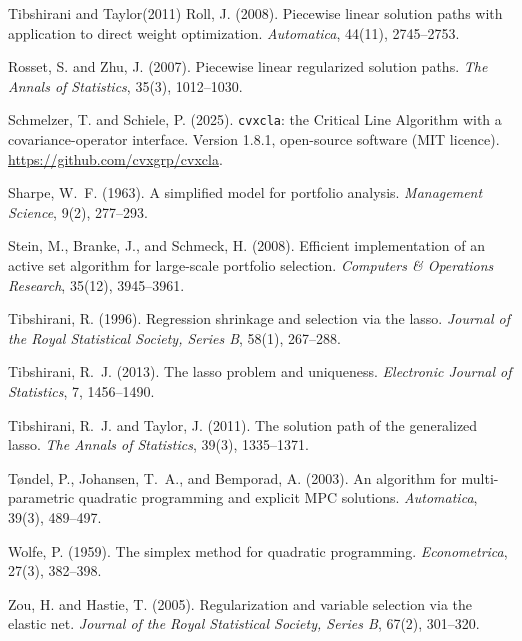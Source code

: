 \documentclass[sts]{imsart}
\theoremstyle{plain}
\theoremstyle{definition}
\begin{document}
\begin{thebibliography}{Tibshirani and Taylor(2011)}
 Roll, J. (2008). Piecewise linear solution paths with
application to direct weight optimization. \emph{Automatica}, 44(11), 2745--2753.

 Rosset, S. and Zhu, J. (2007). Piecewise
linear regularized solution paths. \emph{The Annals of Statistics}, 35(3),
1012--1030.

 Schmelzer, T. and Schiele, P.
(2025). \texttt{cvxcla}: the Critical Line Algorithm with a covariance-operator
interface. Version 1.8.1, open-source software (MIT licence).
\url{https://github.com/cvxgrp/cvxcla}.

 Sharpe, W.~F. (1963). A simplified model for
portfolio analysis. \emph{Management Science}, 9(2), 277--293.

 Stein, M., Branke, J., and Schmeck, H. (2008).
Efficient implementation of an active set algorithm for large-scale portfolio
selection. \emph{Computers \& Operations Research}, 35(12), 3945--3961.

 Tibshirani, R. (1996). Regression
shrinkage and selection via the lasso. \emph{Journal of the Royal Statistical
Society, Series B}, 58(1), 267--288.

 Tibshirani, R.~J. (2013). The lasso problem
and uniqueness. \emph{Electronic Journal of Statistics}, 7, 1456--1490.

 Tibshirani, R.~J. and Taylor,
J. (2011). The solution path of the generalized lasso. \emph{The Annals of
Statistics}, 39(3), 1335--1371.

 T{\o}ndel, P., Johansen, T.~A., and
Bemporad, A. (2003). An algorithm for multi-parametric quadratic programming and
explicit MPC solutions. \emph{Automatica}, 39(3), 489--497.

 Wolfe, P. (1959). The simplex method for quadratic
programming. \emph{Econometrica}, 27(3), 382--398.

 Zou, H. and Hastie, T. (2005). Regularization
and variable selection via the elastic net. \emph{Journal of the Royal Statistical
Society, Series B}, 67(2), 301--320.

\end{thebibliography}
\end{document}
